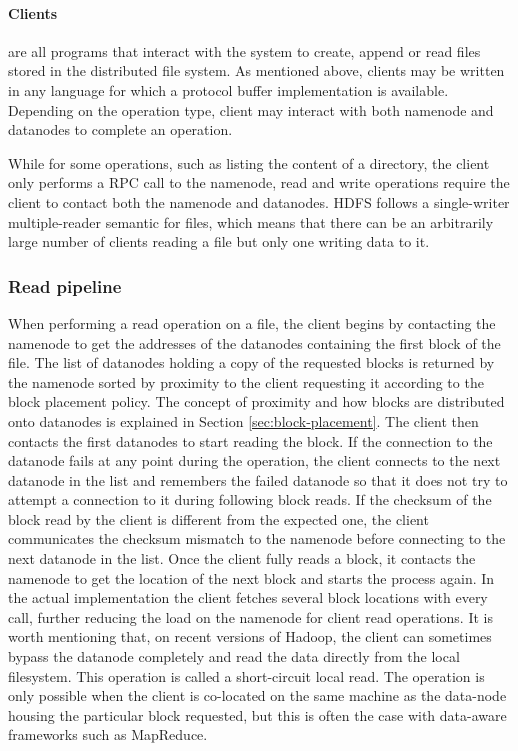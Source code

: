 \paragraph{Clients} are all programs that interact with the system to create, append or read files stored in the distributed file system.
As mentioned above, clients may be written in any language for which a protocol buffer implementation is available.
Depending on the operation type, client may interact with both namenode and datanodes to complete an operation.

While for some operations, such as listing the content of a directory, the client only performs a RPC call to the namenode, read and write operations require the client to contact both the namenode and datanodes.
HDFS follows a single-writer multiple-reader semantic for files, which means that there can be an arbitrarily large number of clients reading a file but only one writing data to it.

\subsubsection{Read pipeline}
When performing a read operation on a file, the client begins by contacting the namenode to get the addresses of the datanodes containing the first block of the file.
The list of datanodes holding a copy of the requested blocks is returned by the namenode sorted by proximity to the client requesting it according to the block placement policy.
The concept of proximity and how blocks are distributed onto datanodes is explained in Section \ref{sec:block-placement}.
The client then contacts the first datanodes to start reading the block.
If the connection to the datanode fails at any point during the operation, the client connects to the next datanode in the list and remembers the failed datanode so that it does not try to attempt a connection to it during following block reads.
If the checksum of the block read by the client is different from the expected one, the client communicates the checksum mismatch to the namenode before connecting to the next datanode in the list.
Once the client fully reads a block, it contacts the namenode to get the location of the next block and starts the process again.
In the actual implementation the client fetches several block locations with every call, further reducing the load on the namenode for client read operations.
It is worth mentioning that, on recent versions of Hadoop, the client can sometimes bypass the datanode completely and read the data directly from the local filesystem.
This operation is called a short-circuit local read.
The operation is only possible when the client is co-located on the same machine as the data-node housing the particular block requested, but this is often the case with data-aware frameworks such as MapReduce.

